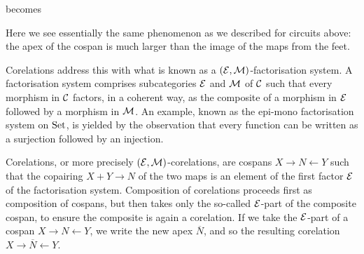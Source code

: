 becomes
\begin{center}
\end{center}
Here we see essentially the same phenomenon as we described for circuits above:
the apex of the cospan is much larger than the image of the maps from the feet.

Corelations address this with what is known as a $(\mathcal E,\mathcal M)$-factorisation
system. A factorisation system comprises subcategories $\mathcal E$ and $\mathcal M$ of
$\mathcal C$ such that every morphism in $\mathcal C$ factors, in a coherent way, as the
composite of a morphism in $\mathcal E$ followed by a morphism in $\mathcal M$. An
example, known as the epi-mono factorisation system on $\mathrm{Set}$, is yielded by the
observation that every function can be written as a surjection followed by an
injection.

Corelations, or more precisely $(\mathcal E,\mathcal M)$-corelations, are cospans $X
\to N \leftarrow Y$ such that the copairing $X+Y \to N$ of the two maps is an
element of the first factor $\mathcal E$ of the factorisation system. Composition of
corelations proceeds first as composition of cospans, but then takes only the
so-called $\mathcal E$-part of the composite cospan, to ensure the composite is again
a corelation. If we take the $\mathcal E$-part of a cospan $X \to N \leftarrow Y$, we
write the new apex $\overline{N}$, and so the resulting corelation $X \to
\overline{N} \leftarrow Y$. 

